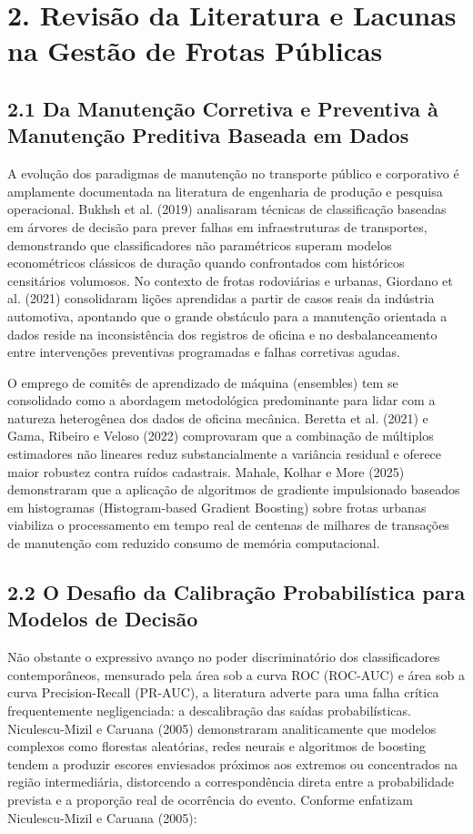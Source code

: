 \documentclass[10pt,a4paper,journal]{article}
\begin{document}
\section{2. Revisão da Literatura e Lacunas na Gestão de Frotas Públicas}
\subsection{2.1 Da Manutenção Corretiva e Preventiva à Manutenção Preditiva Baseada em Dados}
A evolução dos paradigmas de manutenção no transporte público e corporativo é amplamente documentada na literatura de engenharia de produção e pesquisa operacional. Bukhsh et al. (2019) analisaram técnicas de classificação baseadas em árvores de decisão para prever falhas em infraestruturas de transportes, demonstrando que classificadores não paramétricos superam modelos econométricos clássicos de duração quando confrontados com históricos censitários volumosos. No contexto de frotas rodoviárias e urbanas, Giordano et al. (2021) consolidaram lições aprendidas a partir de casos reais da indústria automotiva, apontando que o grande obstáculo para a manutenção orientada a dados reside na inconsistência dos registros de oficina e no desbalanceamento entre intervenções preventivas programadas e falhas corretivas agudas.

O emprego de comitês de aprendizado de máquina (ensembles) tem se consolidado como a abordagem metodológica predominante para lidar com a natureza heterogênea dos dados de oficina mecânica. Beretta et al. (2021) e Gama, Ribeiro e Veloso (2022) comprovaram que a combinação de múltiplos estimadores não lineares reduz substancialmente a variância residual e oferece maior robustez contra ruídos cadastrais. Mahale, Kolhar e More (2025) demonstraram que a aplicação de algoritmos de gradiente impulsionado baseados em histogramas (Histogram-based Gradient Boosting) sobre frotas urbanas viabiliza o processamento em tempo real de centenas de milhares de transações de manutenção com reduzido consumo de memória computacional.

\subsection{2.2 O Desafio da Calibração Probabilística para Modelos de Decisão}
Não obstante o expressivo avanço no poder discriminatório dos classificadores contemporâneos, mensurado pela área sob a curva ROC (ROC-AUC) e área sob a curva Precision-Recall (PR-AUC), a literatura adverte para uma falha crítica frequentemente negligenciada: a descalibração das saídas probabilísticas. Niculescu-Mizil e Caruana (2005) demonstraram analiticamente que modelos complexos como florestas aleatórias, redes neurais e algoritmos de boosting tendem a produzir escores enviesados próximos aos extremos ou concentrados na região intermediária, distorcendo a correspondência direta entre a probabilidade prevista e a proporção real de ocorrência do evento. Conforme enfatizam Niculescu-Mizil e Caruana (2005):
\end{document}
